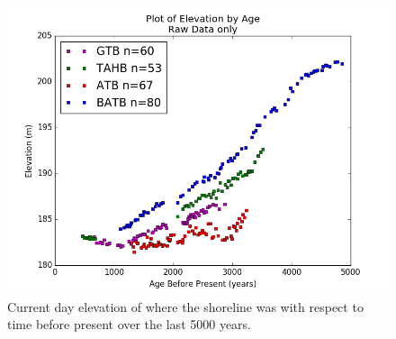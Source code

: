 \begin{figure}[h]
	\includegraphics[width=1.1\linewidth]{data/theDataRaw.png}
	\caption{Current day elevation of where the shoreline was with respect to time before present over the last 5000 years.}
	\label{fig:rawData}
\end{figure} 
%
